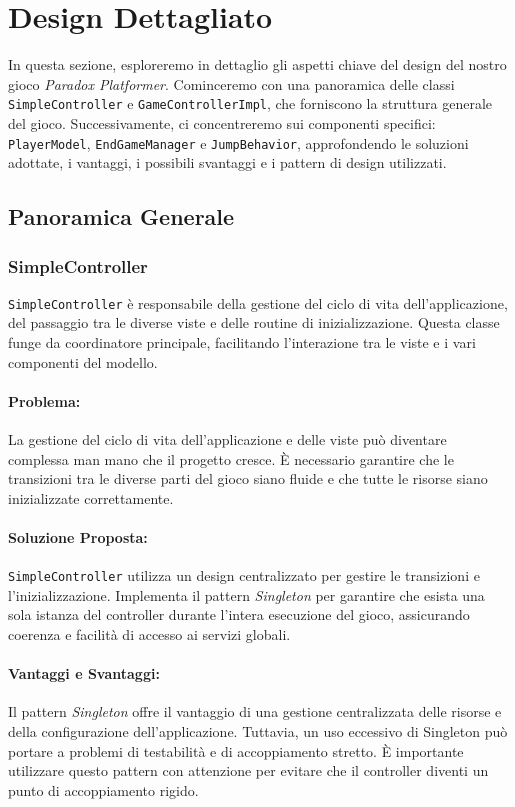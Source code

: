 \documentclass[a4paper,12pt]{report}
\begin{document}
\section{Design Dettagliato}

In questa sezione, esploreremo in dettaglio gli aspetti chiave del design del nostro gioco \textit{Paradox Platformer}. Cominceremo con una panoramica delle classi \texttt{SimpleController} e \texttt{GameControllerImpl}, che forniscono la struttura generale del gioco. Successivamente, ci concentreremo sui componenti specifici: \texttt{PlayerModel}, \texttt{EndGameManager} e \texttt{JumpBehavior}, approfondendo le soluzioni adottate, i vantaggi, i possibili svantaggi e i pattern di design utilizzati.

\subsection{Panoramica Generale}

\subsubsection{SimpleController}

\texttt{SimpleController} è responsabile della gestione del ciclo di vita dell'applicazione, del passaggio tra le diverse viste e delle routine di inizializzazione. Questa classe funge da coordinatore principale, facilitando l'interazione tra le viste e i vari componenti del modello.

\paragraph{Problema:} La gestione del ciclo di vita dell'applicazione e delle viste può diventare complessa man mano che il progetto cresce. È necessario garantire che le transizioni tra le diverse parti del gioco siano fluide e che tutte le risorse siano inizializzate correttamente.

\paragraph{Soluzione Proposta:} \texttt{SimpleController} utilizza un design centralizzato per gestire le transizioni e l'inizializzazione. Implementa il pattern \textit{Singleton} per garantire che esista una sola istanza del controller durante l'intera esecuzione del gioco, assicurando coerenza e facilità di accesso ai servizi globali.

\paragraph{Vantaggi e Svantaggi:} 
Il pattern \textit{Singleton} offre il vantaggio di una gestione centralizzata delle risorse e della configurazione dell'applicazione. Tuttavia, un uso eccessivo di Singleton può portare a problemi di testabilità e di accoppiamento stretto. È importante utilizzare questo pattern con attenzione per evitare che il controller diventi un punto di accoppiamento rigido.
\end{document}
